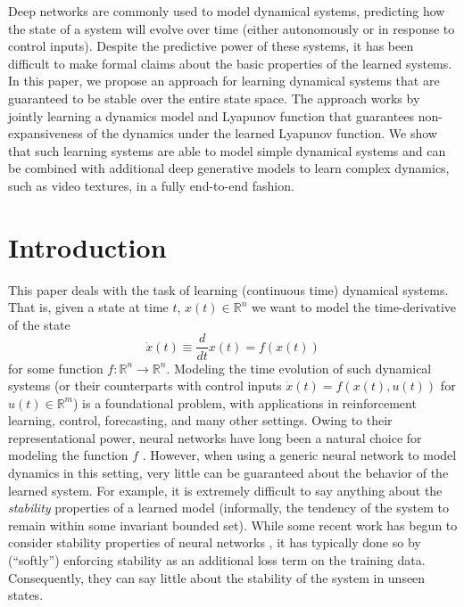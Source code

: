 Deep networks are commonly used to model dynamical systems, predicting how the state of a system will evolve over time (either autonomously or in response to control inputs). Despite the predictive power of these systems, it has been difficult to make formal claims about the basic properties of the learned systems. In this paper, we propose an approach for learning dynamical systems that are guaranteed to be stable over the entire state space. The approach works by jointly learning a dynamics model and Lyapunov function that guarantees non-expansiveness of the dynamics under the learned Lyapunov function. We show that such learning systems are able to model simple dynamical systems and can be combined with additional deep generative models to learn complex dynamics, such as video textures, in a fully end-to-end fashion.

\clearpage

\section{Introduction}

This paper deals with the task of learning (continuous time) dynamical systems.  That is, given a state at time $t$, $x(t) \in \mathbb{R}^n$ we want to model the time-derivative of the state
\begin{equation}
    \dot{x}(t) \equiv \frac{d}{dt}x(t) = f(x(t))
\end{equation}
for some function $f : \mathbb{R}^n \rightarrow \mathbb{R}^n$. Modeling the time evolution of such dynamical systems (or their counterparts with control inputs $\dot{x}(t) = f(x(t),u(t))$ for $u(t) \in \mathbb{R}^m$) is a foundational problem, with applications in reinforcement learning, control, forecasting, and many other settings.  Owing to their representational power, neural networks have long been a natural choice for modeling the function $f$ \citep{gu2016continuous,nagabandi2018neural,mishra2017prediction,gal2016improving}.  However, when using a generic neural network to model dynamics in this setting, very little can be guaranteed about the behavior of the learned system.  For example, it is extremely difficult to say anything about the \emph{stability} properties of a learned model (informally, the tendency of the system to remain within some invariant bounded set).  While some recent work has begun to consider stability properties of neural networks \citep{chow2018lyapunov,richards2018lyapunov,taylor2019episodic}, it has typically done so by (``softly'') enforcing stability as an additional loss term on the training data. Consequently, they can say little about the stability of the system in unseen states.

